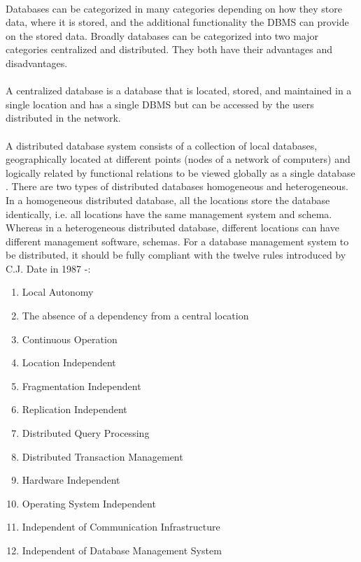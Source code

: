 \documentclass[12pt]{article}
\begin{document}
        \paragraph{}
        Databases can be categorized in many categories depending on how they store data, where it is stored, and the additional functionality the DBMS can provide on the stored data. Broadly databases can be categorized into two major categories centralized and distributed. They both have their advantages and disadvantages.
        \paragraph{}
        A centralized database is a database that is located, stored, and maintained in a single location and has a single DBMS but can be accessed by the users distributed in the network.
        \paragraph{}
        A distributed database system consists of a collection of local databases,  geographically located at different points (nodes of a network of computers) and  logically related by functional relations to be viewed globally as a single database \cite{distributeddatabase}.
        There are two types of distributed databases homogeneous and heterogeneous. In a homogeneous distributed database, all the locations store the database identically, i.e. all locations have the same management system and schema. Whereas in a heterogeneous distributed database, different locations can have different management software, schemas.
        For a database management system to be distributed, it should be fully compliant with the twelve rules introduced by C.J. Date in 1987 \cite{distributeddbms} -:
        \begin{enumerate}
            \item Local Autonomy
            \item The absence of a dependency from a central location
            \item Continuous Operation
            \item Location Independent
            \item Fragmentation Independent
            \item Replication  Independent
            \item Distributed Query Processing
            \item Distributed Transaction Management
            \item Hardware Independent
            \item Operating System Independent
            \item Independent of Communication  Infrastructure
            \item Independent of Database Management System
        \end{enumerate}
        
\end{document}
